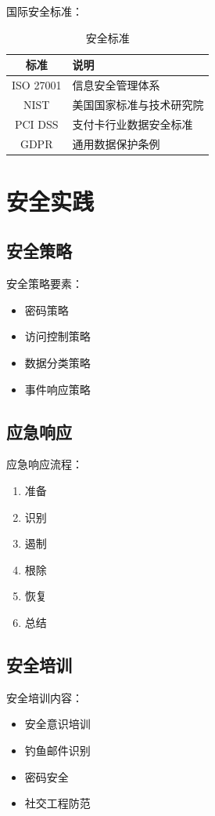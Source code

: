 \documentclass[12pt,UTF8]{ctexbook}
\begin{document}
国际安全标准：
\begin{table}[htbp]
    \centering
    \caption{安全标准}
    \begin{tabular}{|c|p{8cm}|}
        \hline
        \textbf{标准} & \textbf{说明} \\
        \hline
        ISO 27001 & 信息安全管理体系 \\
        \hline
        NIST & 美国国家标准与技术研究院 \\
        \hline
        PCI DSS & 支付卡行业数据安全标准 \\
        \hline
        GDPR & 通用数据保护条例 \\
        \hline
    \end{tabular}
\end{table}

\chapter{安全实践}
\label{chap:practices}

\section{安全策略}
\label{sec:security_policy}

安全策略要素：
\begin{itemize}
    \item 密码策略
    \item 访问控制策略
    \item 数据分类策略
    \item 事件响应策略
\end{itemize}

\section{应急响应}
\label{sec:incident_response}

应急响应流程：
\begin{enumerate}
    \item 准备
    \item 识别
    \item 遏制
    \item 根除
    \item 恢复
    \item 总结
\end{enumerate}

\section{安全培训}
\label{sec:security_training}

安全培训内容：
\begin{itemize}
    \item 安全意识培训
    \item 钓鱼邮件识别
    \item 密码安全
    \item 社交工程防范
\end{itemize}

\backmatter
\end{document}
